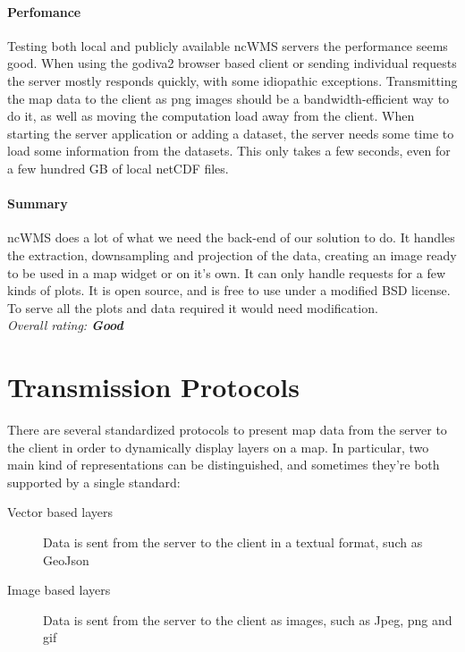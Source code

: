 \documentclass[11pt,a4paper,titlepage,oneside]{report}
\begin{document}
    \paragraph{Perfomance}
    Testing both local and publicly available ncWMS servers the performance seems good. When using the godiva2 browser based client or sending individual requests the server mostly responds quickly, with some idiopathic exceptions. Transmitting the map data to the client as png images should be a bandwidth-efficient way to do it, as well as moving the computation load away from the client. When starting the server application or adding a dataset, the server needs some time to load some information from the datasets. This only takes a few seconds, even for a few hundred GB of local netCDF files.
    \paragraph{Summary}
    ncWMS does a lot of what we need the back-end of our solution to do. It handles the extraction, downsampling and projection of the data, creating an image ready to be used in a map widget or on it's own. It can only handle requests for a few kinds of plots. It is open source, and is free to use under a modified BSD license. To serve all the plots and data required it would need modification.
  \\ \emph{Overall rating: \textbf{Good}}

\section{Transmission Protocols}
  There are several standardized protocols to present map data from the server to the client in order to dynamically display layers on a map.
  In particular, two main kind of representations can be distinguished, and sometimes they're both supported by a single standard:
  \begin{description}
    \item[Vector based layers] Data is sent from the server to the client in a textual format, such as GeoJson
    \item[Image based layers] Data is sent from the server to the client as images, such as Jpeg, png and gif
  \end{description}
\end{document}
